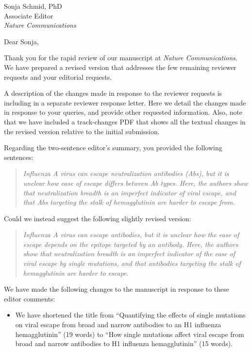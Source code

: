 \documentclass[a4paper,11pt]{letter}
\begin{document}
\begin{letter}{Sonja Schmid, PhD \\ Associate Editor \\ \textit{Nature Communications} }

\opening{Dear Sonja,} %

Thank you for the rapid review of our manuscript at \textit{Nature Communications}. 
We have prepared a revised version that addresses the few remaining reviewer requests and your editorial requests.

A description of the changes made in response to the reviewer requests is including in a separate reviewer response letter.
Here we detail the changes made in response to your queries, and provide other requested information.
Also, note that we have included a track-changes PDF that shows all the textual changes in the revised version relative to the initial submission.

Regarding the two-sentence editor's summary, you provided the following sentences:
\begin{quote}
\textsl{
Influenza A virus can escape neutralization antibodies (Abs), but it is unclear how ease of escape differs between Ab types. Here, the authors show that neutralization breadth is an imperfect indicator of viral escape, and that Abs targeting the stalk of hemagglutinin are harder to escape from.}
\end{quote}

Could we instead suggest the following slightly revised version:
\begin{quote}
\textsl{
Influenza A virus can escape antibodies, but it is unclear how the ease of escape depends on the epitope targeted by an antibody. Here, the authors show that neutralization breadth is an imperfect indicator of the ease of viral escape by single mutations, and that antibodies targeting the stalk of hemagglutinin are harder to escape.
}
\end{quote}

We have made the following changes to the manuscript in response to these editor comments:
\begin{itemize}

\item We have shortened the title from ``Quantifying the effects of single mutations on viral escape from broad and narrow antibodies to an H1 influenza hemagglutinin'' (19 words) to ``How single mutations affect viral escape from broad and narrow antibodies to H1 influenza hemagglutinin'' (15 words). 


\end{itemize}
\end{letter}
\end{document}

